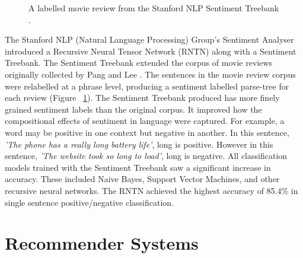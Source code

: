 \begin{figure}[h!]
\centering
{}
\caption{\label{fig:treebank} A labelled movie review from the Stanford NLP Sentiment Treebank \cite{stanfordSentiment2013}.}
\end{figure}

The Stanford NLP (Natural Language Processing) Group's Sentiment Analyser \cite{stanfordSentiment2013} introduced a Recursive Neural Tensor Network (RNTN) along with a Sentiment Treebank. The Sentiment Treebank extended the corpus of movie reviews originally collected by Pang and Lee \cite{panglee2004}. The sentences in the movie review corpus were relabelled at a phrase level, producing a sentiment labelled parse-tree for each review (Figure ~\ref{fig:treebank}). The Sentiment Treebank produced has more finely grained sentiment labels than the original corpus. It improved how the compositional effects of sentiment in language were captured. For example, a word may be positive in one context but negative in another. In this sentence, \emph{'The phone has a really long battery life'}, long is positive. However in this sentence, \emph{'The website took so long to load'}, long is negative. All classification models trained with the Sentiment Treebank saw a significant increase in accuracy. These included Naive Bayes, Support Vector Machines, and other recursive neural networks. The RNTN achieved the highest accuracy of 85.4\% in single sentence positive/negative classification.

\section{Recommender Systems}


